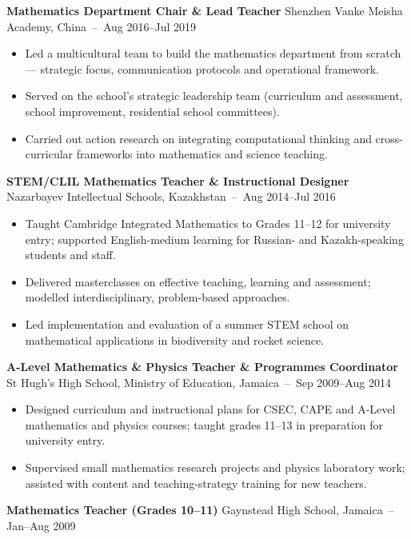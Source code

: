 \documentclass[10pt,a4paper]{article}
\newcommand{\entry}[2]{{\textbf{#1}} \hfill {\small\color{muted}#2}\\[1pt]}
\begin{document}
\entry{Mathematics Department Chair \& Lead Teacher}{Shenzhen Vanke Meisha Academy, China \,--\, Aug 2016--Jul 2019}
\begin{itemize}[leftmargin=1.3em,itemsep=1.5pt,topsep=2pt]
  \item Led a multicultural team to build the mathematics department from scratch --- strategic focus, communication protocols and operational framework.
  \item Served on the school's strategic leadership team (curriculum and assessment, school improvement, residential school committees).
  \item Carried out action research on integrating computational thinking and cross-curricular frameworks into mathematics and science teaching.
\end{itemize}

\entry{STEM/CLIL Mathematics Teacher \& Instructional Designer}{Nazarbayev Intellectual Schools, Kazakhstan \,--\, Aug 2014--Jul 2016}
\begin{itemize}[leftmargin=1.3em,itemsep=1.5pt,topsep=2pt]
  \item Taught Cambridge Integrated Mathematics to Grades 11--12 for university entry; supported English-medium learning for Russian- and Kazakh-speaking students and staff.
  \item Delivered masterclasses on effective teaching, learning and assessment; modelled interdisciplinary, problem-based approaches.
  \item Led implementation and evaluation of a summer STEM school on mathematical applications in biodiversity and rocket science.
\end{itemize}

\entry{A-Level Mathematics \& Physics Teacher \& Programmes Coordinator}{St Hugh's High School, Ministry of Education, Jamaica \,--\, Sep 2009--Aug 2014}
\begin{itemize}[leftmargin=1.3em,itemsep=1.5pt,topsep=2pt]
  \item Designed curriculum and instructional plans for CSEC, CAPE and A-Level mathematics and physics courses; taught grades 11--13 in preparation for university entry.
  \item Supervised small mathematics research projects and physics laboratory work; assisted with content and teaching-strategy training for new teachers.
\end{itemize}

\entry{Mathematics Teacher (Grades 10--11)}{Gaynstead High School, Jamaica \,--\, Jan--Aug 2009}
\end{document}

